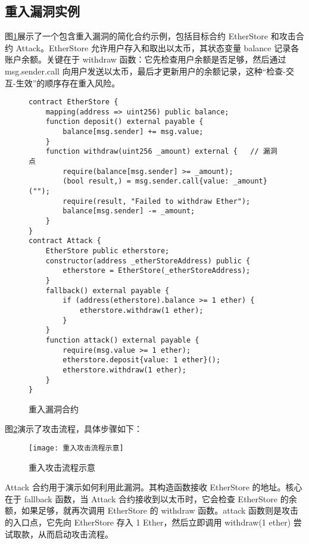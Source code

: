 \documentclass[print, master, vlined, timesmath]{DissertUESTC}
\begin{document}
\subsection{重入漏洞实例}

图\ref{fig:重入漏洞合约}展示了一个包含重入漏洞的简化合约示例，包括目标合约 EtherStore 和攻击合约 Attack。EtherStore 允许用户存入和取出以太币，其状态变量 balance 记录各账户余额。关键在于 withdraw 函数：它先检查用户余额是否足够，然后通过 msg.sender.call 向用户发送以太币，最后才更新用户的余额记录，这种“检查-交互-生效”的顺序存在重入风险。
\begin{figure}[h]
    \raggedbottom
    \centering
    \begin{minipage}{0.9\textwidth}
    \begin{verbatim}
contract EtherStore {
    mapping(address => uint256) public balance;
    function deposit() external payable {
        balance[msg.sender] += msg.value;
    }
    function withdraw(uint256 _amount) external {   // 漏洞点
        require(balance[msg.sender] >= _amount);
        (bool result,) = msg.sender.call{value: _amount}("");
        require(result, "Failed to withdraw Ether");
        balance[msg.sender] -= _amount;
    }
}
contract Attack {
    EtherStore public etherstore;
    constructor(address _etherStoreAddress) public {
        etherstore = EtherStore(_etherStoreAddress);
    }
    fallback() external payable {
        if (address(etherstore).balance >= 1 ether) {
            etherstore.withdraw(1 ether);
        }
    }
    function attack() external payable {
        require(msg.value >= 1 ether);
        etherstore.deposit{value: 1 ether}();
        etherstore.withdraw(1 ether);
    }
}
\end{verbatim}
\end{minipage}
\caption{重入漏洞合约}
\label{fig:重入漏洞合约}
\end{figure}


图\ref{fig:重入攻击流程示意}演示了攻击流程，具体步骤如下：
\begin{figure}[h]
    \centering
    \texttt{[image: 重入攻击流程示意]}
    \caption{重入攻击流程示意}
    \label{fig:重入攻击流程示意}
\end{figure}

Attack 合约用于演示如何利用此漏洞。其构造函数接收 EtherStore 的地址。核心在于 fallback 函数，当 Attack 合约接收到以太币时，它会检查 EtherStore 的余额，如果足够，就再次调用 EtherStore 的 withdraw 函数。attack 函数则是攻击的入口点，它先向 EtherStore 存入 1 Ether，然后立即调用 withdraw(1 ether) 尝试取款，从而启动攻击流程。
\end{document}
